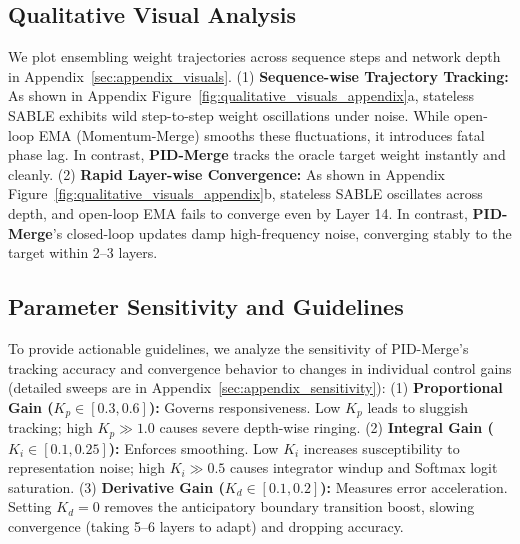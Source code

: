 \subsection{Qualitative Visual Analysis}
We plot ensembling weight trajectories across sequence steps and network depth in Appendix~\ref{sec:appendix_visuals}.
(1) \textbf{Sequence-wise Trajectory Tracking:} As shown in Appendix Figure~\ref{fig:qualitative_visuals_appendix}a, stateless SABLE exhibits wild step-to-step weight oscillations under noise. While open-loop EMA (Momentum-Merge) smooths these fluctuations, it introduces fatal phase lag. In contrast, \textbf{PID-Merge} tracks the oracle target weight instantly and cleanly.
(2) \textbf{Rapid Layer-wise Convergence:} As shown in Appendix Figure~\ref{fig:qualitative_visuals_appendix}b, stateless SABLE oscillates across depth, and open-loop EMA fails to converge even by Layer 14. In contrast, \textbf{PID-Merge}'s closed-loop updates damp high-frequency noise, converging stably to the target within 2--3 layers.

\subsection{Parameter Sensitivity and Guidelines}
To provide actionable guidelines, we analyze the sensitivity of PID-Merge's tracking accuracy and convergence behavior to changes in individual control gains (detailed sweeps are in Appendix~\ref{sec:appendix_sensitivity}):
(1) \textbf{Proportional Gain ($K_p \in [0.3, 0.6]$):} Governs responsiveness. Low $K_p$ leads to sluggish tracking; high $K_p \gg 1.0$ causes severe depth-wise ringing.
(2) \textbf{Integral Gain ($K_i \in [0.1, 0.25]$):} Enforces smoothing. Low $K_i$ increases susceptibility to representation noise; high $K_i \gg 0.5$ causes integrator windup and Softmax logit saturation.
(3) \textbf{Derivative Gain ($K_d \in [0.1, 0.2]$):} Measures error acceleration. Setting $K_d = 0$ removes the anticipatory boundary transition boost, slowing convergence (taking 5--6 layers to adapt) and dropping accuracy.
